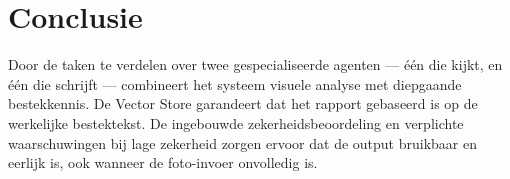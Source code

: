 \documentclass[a4paper,11pt]{article}
\begin{document}
\section{Conclusie}

Door de taken te verdelen over twee gespecialiseerde agenten --- één die
kijkt, en één die schrijft --- combineert het systeem visuele analyse met
diepgaande bestek\-kennis. De Vector Store garandeert dat het rapport
gebaseerd is op de werkelijke bestektekst. De ingebouwde
zekerheidsbeoordeling en verplichte waarschuwingen bij lage zekerheid
zorgen ervoor dat de output bruikbaar en eerlijk is, ook wanneer de
foto-invoer onvolledig is.
\end{document}
